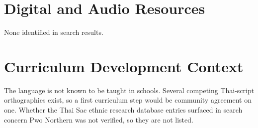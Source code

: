 \documentclass[12pt]{article}
\begin{document}
\section{Digital and Audio Resources}
None identified in search results.

\section{Curriculum Development Context}
The language is not known to be taught in schools. Several competing Thai-script orthographies exist, so a first curriculum step would be community agreement on one. Whether the Thai Sac ethnic research database entries surfaced in search concern Pwo Northern was not verified, so they are not listed.
\end{document}
